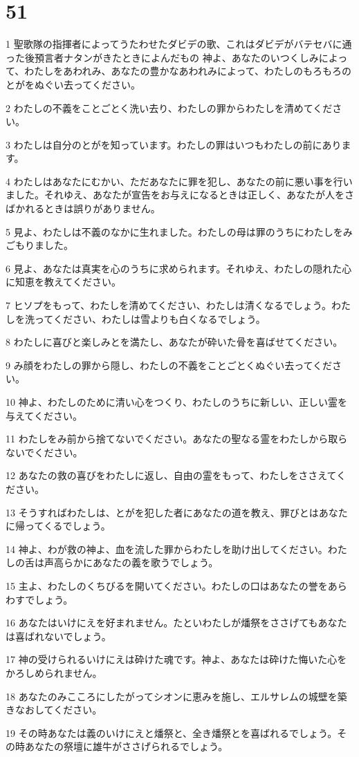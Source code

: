 \chapter{51}

\par 1 聖歌隊の指揮者によってうたわせたダビデの歌、これはダビデがバテセバに通った後預言者ナタンがきたときによんだもの 神よ、あなたのいつくしみによって、わたしをあわれみ、あなたの豊かなあわれみによって、わたしのもろもろのとがをぬぐい去ってください。
\par 2 わたしの不義をことごとく洗い去り、わたしの罪からわたしを清めてください。
\par 3 わたしは自分のとがを知っています。わたしの罪はいつもわたしの前にあります。
\par 4 わたしはあなたにむかい、ただあなたに罪を犯し、あなたの前に悪い事を行いました。それゆえ、あなたが宣告をお与えになるときは正しく、あなたが人をさばかれるときは誤りがありません。
\par 5 見よ、わたしは不義のなかに生れました。わたしの母は罪のうちにわたしをみごもりました。
\par 6 見よ、あなたは真実を心のうちに求められます。それゆえ、わたしの隠れた心に知恵を教えてください。
\par 7 ヒソプをもって、わたしを清めてください、わたしは清くなるでしょう。わたしを洗ってください、わたしは雪よりも白くなるでしょう。
\par 8 わたしに喜びと楽しみとを満たし、あなたが砕いた骨を喜ばせてください。
\par 9 み顔をわたしの罪から隠し、わたしの不義をことごとくぬぐい去ってください。
\par 10 神よ、わたしのために清い心をつくり、わたしのうちに新しい、正しい霊を与えてください。
\par 11 わたしをみ前から捨てないでください。あなたの聖なる霊をわたしから取らないでください。
\par 12 あなたの救の喜びをわたしに返し、自由の霊をもって、わたしをささえてください。
\par 13 そうすればわたしは、とがを犯した者にあなたの道を教え、罪びとはあなたに帰ってくるでしょう。
\par 14 神よ、わが救の神よ、血を流した罪からわたしを助け出してください。わたしの舌は声高らかにあなたの義を歌うでしょう。
\par 15 主よ、わたしのくちびるを開いてください。わたしの口はあなたの誉をあらわすでしょう。
\par 16 あなたはいけにえを好まれません。たといわたしが燔祭をささげてもあなたは喜ばれないでしょう。
\par 17 神の受けられるいけにえは砕けた魂です。神よ、あなたは砕けた悔いた心をかろしめられません。
\par 18 あなたのみこころにしたがってシオンに恵みを施し、エルサレムの城壁を築きなおしてください。
\par 19 その時あなたは義のいけにえと燔祭と、全き燔祭とを喜ばれるでしょう。その時あなたの祭壇に雄牛がささげられるでしょう。

